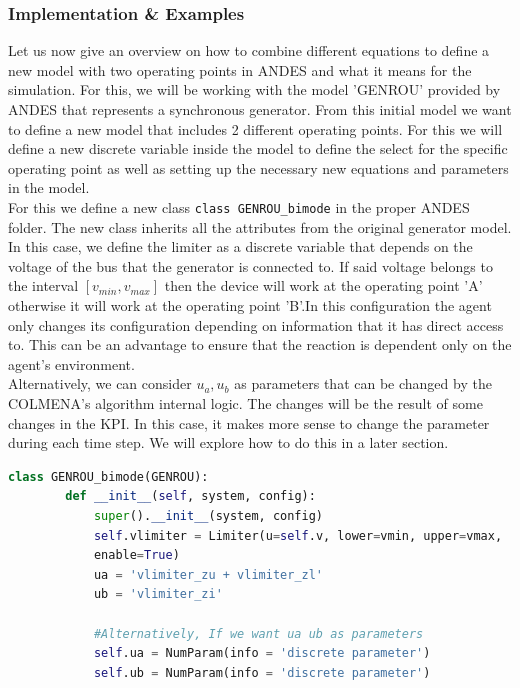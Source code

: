 \documentclass{report}
\begin{document}
\subsubsection{Implementation \& Examples}

Let us now give an overview on how to combine different equations to define a new model with two operating points in ANDES and what it means for the simulation. For this, we will be working with the model 'GENROU' provided by ANDES that represents a synchronous generator. From this initial model we want to define a new model that includes 2 different operating points. For this we will define a new discrete variable inside the model to define the select for the specific operating point as well as setting up the necessary new equations and parameters in the model. \\

For this we define a new class \lstinline!class GENROU_bimode! in the proper ANDES folder. The new class inherits all the attributes from the original generator model. In this case, we define the limiter as a discrete variable that depends on the voltage of the bus that the generator is connected to. If said voltage belongs to the interval $[v_{min}, v_{max}]$ then the device will work at the operating point 'A' otherwise it will work at the operating point 'B'.In this configuration the agent only changes its configuration depending on information that it has direct access to. This can be an advantage to ensure that the reaction is dependent only on the agent's environment. \\  

Alternatively, we can consider $u_a, u_b$ as parameters that can be changed by the COLMENA's algorithm internal logic. The changes will be the result of some changes in the KPI. In this case, it makes more sense to change the parameter during each time step. We will explore how to do this in a later section.\\ 

\begin{lstlisting}[language=Python, basicstyle=\small, breaklines=true]
    class GENROU_bimode(GENROU):
        def __init__(self, system, config):
            super().__init__(system, config)
            self.vlimiter = Limiter(u=self.v, lower=vmin, upper=vmax,
            enable=True)
            ua = 'vlimiter_zu + vlimiter_zl' 
            ub = 'vlimiter_zi' 

            #Alternatively, If we want ua ub as parameters
            self.ua = NumParam(info = 'discrete parameter')
            self.ub = NumParam(info = 'discrete parameter')
\end{lstlisting}
\end{document}
